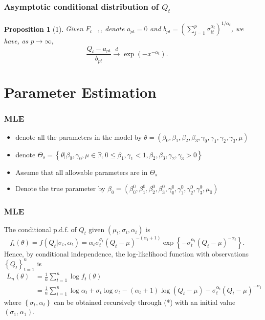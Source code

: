 \documentclass{beamer}
\newcommand{\set}[1]{\left\{#1\right\}}
\newtheorem{prop}{Proposition}[section]
\begin{document}
\begin{frame}
    \frametitle{Asymptotic conditional distribution of $Q_t$}
    \begin{prop}[1]
    Given $F_{t-1}$, denote $a_{pt} = 0$ and $b_{pt}=(\sum_{j=1}^p \sigma_{it}^{\alpha_t})^{1/\alpha_t}$, we have, as $p\to \infty$,
    $$
\frac{Q_t-a_{pt}}{b_{pt}} \stackrel{d}{\to} \exp(-x^{-\alpha_t}).
    $$
   \end{prop}
    

\end{frame}

\section{Parameter Estimation}


\begin{frame}
    \frametitle{MLE}
    \begin{itemize}
        \item denote all the parameters in the model by $\theta=(\beta_0,\beta_1,\beta_2,\beta_3,\gamma_0,\gamma_1,\gamma_2,\gamma_3,\mu)$
        \bigskip
        \item   denote $\Theta_s=\set{\theta|\beta_0,\gamma_0,\mu\in \mathbb{R}, 0\le \beta_1,\gamma_1<1,\beta_2,\beta_3,\gamma_2,\gamma_3>0}$
        \bigskip
        \item Assume that all allowable parameters are in $\Theta_s$
        \bigskip
        \item Denote the true parameter by $\beta_0=(\beta_0^0,\beta_1^0,\beta_2^0,\beta_3^0,\gamma_0^0,\gamma_1^0,\gamma_2^0,\gamma_3^0,\mu_0)$
    \end{itemize}
\end{frame}


\begin{frame}
    \frametitle{MLE}
    The conditional p.d.f. of $Q_t$ given $(\mu_t,\sigma_t,\alpha_t)$ is 
    $$
f_t(\theta)=f(Q_t|\sigma_t,\alpha_t)=\alpha_t \sigma_t^{\sigma_t}(Q_t-\mu)^{-(\alpha_t+1)} \exp \set{-\sigma_t^{\alpha_t}(Q_t-\mu)^{-\alpha_t}}.
    $$
    Hence, by conditional independence, the log-likelihood function with observations $\set{Q_t}_{t=1}^{n}$ is 
    $$
    \begin{aligned}
L_n(\theta) & =\frac{1}{n}\sum_{t=1}^n \log f_t(\theta)\\
&=\frac{1}{n}\sum_{i=1}^n \log \alpha_t +\sigma_t \log \sigma_t -(\alpha_t+1) \log(Q_t-\mu)-\sigma_t^{\alpha_t}(Q_t-\mu)^{-\alpha_t}
    \end{aligned}
    $$
where $\set{\sigma_t,\alpha_t}$ can be obtained recursively through (*) with an initial value $(\sigma_1,\alpha_1)$.
    

\end{frame}
\end{document}

